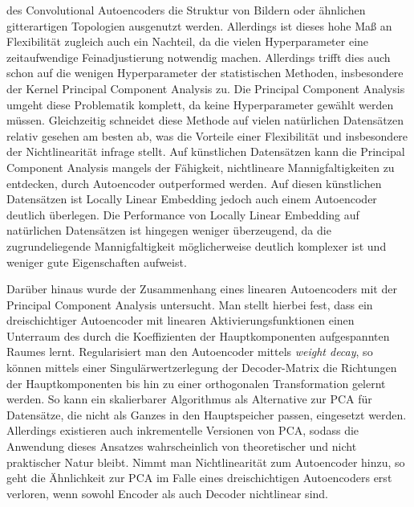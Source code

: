 des Convolutional Autoencoders die Struktur von Bildern oder ähnlichen gitterartigen Topologien
ausgenutzt werden. Allerdings ist dieses hohe Maß an Flexibilität zugleich auch ein Nachteil, da
die vielen Hyperparameter eine zeitaufwendige Feinadjustierung notwendig machen. Allerdings trifft
dies auch schon auf die wenigen Hyperparameter der statistischen Methoden, insbesondere der Kernel
Principal Component Analysis zu. Die Principal Component Analysis umgeht diese Problematik
komplett, da keine Hyperparameter gewählt werden müssen. Gleichzeitig schneidet diese Methode auf
vielen natürlichen Datensätzen relativ gesehen am besten ab, was die Vorteile einer Flexibilität
und insbesondere der Nichtlinearität infrage stellt. Auf künstlichen Datensätzen kann die Principal
Component Analysis mangels der Fähigkeit, nichtlineare Mannigfaltigkeiten zu entdecken, durch
Autoencoder outperformed werden. Auf diesen künstlichen Datensätzen ist Locally Linear Embedding
jedoch auch einem Autoencoder deutlich überlegen. Die Performance von Locally Linear Embedding auf
natürlichen Datensätzen ist hingegen weniger überzeugend, da die zugrundeliegende Mannigfaltigkeit
möglicherweise deutlich komplexer ist und weniger gute Eigenschaften aufweist.

Darüber hinaus wurde der Zusammenhang eines linearen Autoencoders mit der Principal Component
Analysis untersucht. Man stellt hierbei fest, dass ein dreischichtiger Autoencoder mit linearen
Aktivierungsfunktionen einen Unterraum des durch die Koeffizienten der Hauptkomponenten
aufgespannten Raumes lernt. Regularisiert man den Autoencoder mittels \textit{weight decay}, so
können mittels einer Singulärwertzerlegung der Decoder-Matrix die Richtungen der Hauptkomponenten
bis hin zu einer orthogonalen Transformation gelernt werden. So kann ein skalierbarer Algorithmus
als Alternative zur PCA für Datensätze, die nicht als Ganzes in den Hauptspeicher passen,
eingesetzt werden. Allerdings existieren auch inkrementelle Versionen von PCA, sodass die Anwendung
dieses Ansatzes wahrscheinlich von theoretischer und nicht praktischer Natur bleibt. Nimmt man
Nichtlinearität zum Autoencoder hinzu, so geht die Ähnlichkeit zur PCA im Falle eines
dreischichtigen Autoencoders erst verloren, wenn sowohl Encoder als auch Decoder nichtlinear sind.

